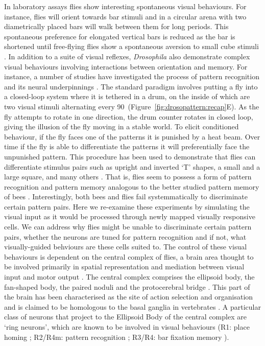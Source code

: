 In laboratory assays flies show interesting spontaneous visual behaviours. For instance, flies will orient towards bar stimuli \cite{Reichardt1969,Gotz1987} and in a circular arena with two diametrically placed bars will walk between them for long periods. This spontaneous preference for elongated vertical bars is reduced as the bar is shortened until free-flying flies show a spontaneous aversion to small cube stimuli \cite{Maimon2008}. In addition to a suite of visual reflexes, \emph{Drosophila} also demonstrate complex visual behaviours involving interactions between orientation and memory.
For instance, a number of studies have investigated the process of pattern recognition and its neural underpinnings \cite{Ernst1999,Liu2006,Pan2009}.
The standard paradigm involves putting a fly into a closed-loop system where it is tethered in a drum, on the inside of which are two visual stimuli alternating every 90\degree\ (Figure~\ref{fig:drosopattern:recap}E). As the fly attempts to rotate in one direction, the drum counter rotates in closed loop, giving the illusion of the fly moving in a stable world. To elicit conditioned behaviour, if the fly faces one of the patterns it is punished by a heat beam. Over time if the fly is able to differentiate the patterns it will preferentially face the unpunished pattern. This procedure has been used to demonstrate that flies can differentiate stimulus pairs such as upright and inverted `T' shapes, a small and a large square, and many others \cite{Ernst1999}. That is, flies seem to possess a form of pattern recognition and pattern memory analogous to the better studied pattern memory of bees \cite{vonFrisch1914,Giurfa1997,Horridge2009}. Interestingly, both bees and flies fail systemmatically to discriminate certain pattern pairs. Here we re-examine these experiments by simulating the visual input as it would be processed through newly mapped visually responsive cells. We can address why flies might be unable to discriminate certain pattern pairs, whether the neurons are tuned for pattern recognition and if not, what visually-guided behviours are these cells suited to. The control of these visual behaviours is dependent on the central complex of flies, a brain area thought to be involved primarily in spatial representation and mediation between visual input and motor output \cite{Pfeiffer2014}.
The central complex comprises the ellipsoid body, the fan-shaped body, the paired noduli and the protocerebral bridge \cite{Young2010}.
This part of the brain has been characterised as the site of action selection and organisation and is claimed to be homologous to the basal ganglia in vertebrates \cite{Strausfeld2013}.
A particular class of neurons that project to the Ellipsoid Body of the central complex are `ring neurons', which are known to be involved in visual behaviours (R1: place homing \cite{Sitaraman2008,Sitaraman2010,Ofstad2011}; R2/R4m: pattern recognition \cite{Ernst1999,Liu2006,Pan2009}; R3/R4: bar fixation memory \cite{Neuser2008}).

